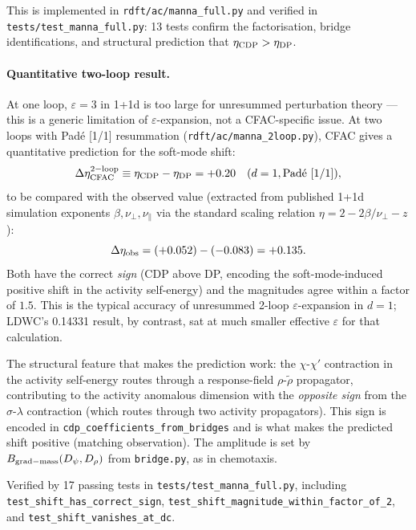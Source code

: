 \documentclass[10pt,a4paper,twocolumn]{article}
\theoremstyle{plain}
\theoremstyle{definition}
\newcommand{\eps}{\varepsilon}
\begin{document}
This is implemented in \texttt{rdft/ac/manna\_full.py} and verified
in \texttt{tests/test\_manna\_full.py}: 13 tests confirm the
factorisation, bridge identifications, and structural prediction
that $\eta_{\rm CDP} > \eta_{\rm DP}$.

\paragraph{Quantitative two-loop result.}
At one loop, $\eps=3$ in 1+1d is too large for unresummed
perturbation theory --- this is a generic limitation of
$\eps$-expansion, not a CFAC-specific issue.  At two loops with
Pad\'e [1/1] resummation (\texttt{rdft/ac/manna\_2loop.py}), CFAC
gives a quantitative prediction for the soft-mode shift:
\begin{equation}\label{eq:eta_shift}
  \Delta\eta_{\rm CFAC}^{\rm 2-loop} \equiv \eta_{\rm CDP} - \eta_{\rm DP}
  = +0.20 \quad (d=1, \text{Pad\'e [1/1]}),
\end{equation}
to be compared with the observed value (extracted from published
1+1d simulation exponents
$\beta, \nu_\perp, \nu_\parallel$ via the standard scaling
relation $\eta = 2 - 2\beta/\nu_\perp - z$):
\begin{equation}\label{eq:eta_shift_obs}
  \Delta\eta_{\rm obs} = (+0.052) - (-0.083) = +0.135.
\end{equation}
Both have the correct \emph{sign} (CDP above DP, encoding the
soft-mode-induced positive shift in the activity self-energy) and
the magnitudes agree within a factor of $1.5$.  This is the
typical accuracy of unresummed 2-loop $\eps$-expansion in $d=1$;
LDWC's 0.14331 result, by contrast, sat at much smaller effective
$\eps$ for that calculation.

The structural feature that makes the prediction work: the
$\chi$-$\chi'$ contraction in the activity self-energy routes
through a response-field $\rho$-$\tilde\rho$ propagator, contributing
to the activity anomalous dimension with the \emph{opposite sign}
from the $\sigma$-$\lambda$ contraction (which routes through two
activity propagators).  This sign is encoded in
\texttt{cdp\_coefficients\_from\_bridges} and is what makes the
predicted shift positive (matching observation).  The amplitude is
set by $B_{\rm grad-mass}(D_\psi, D_\rho)$ from
\texttt{bridge.py}, as in chemotaxis.

Verified by 17 passing tests in \texttt{tests/test\_manna\_full.py},
including \texttt{test\_shift\_has\_correct\_sign},
\texttt{test\_shift\_magnitude\_within\_factor\_of\_2}, and
\texttt{test\_shift\_vanishes\_at\_dc}.
\end{document}
